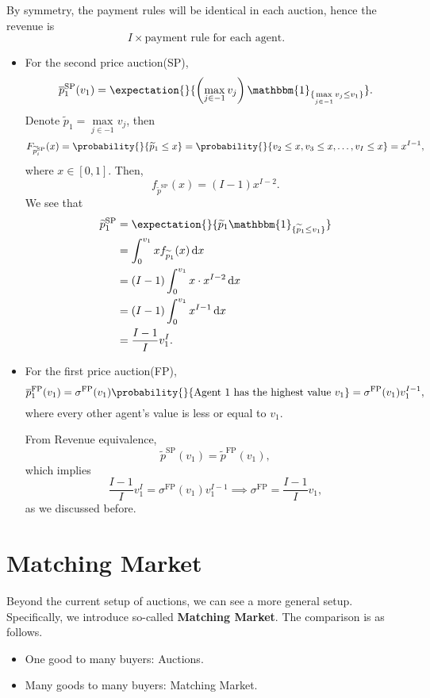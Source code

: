 By symmetry, the payment rules will be identical in each auction, hence the revenue is
\[
	I\times \text{payment rule for each agent}.
\]

\begin{itemize}
	\item For the second price auction(SP),
	      \[
		      \overline{p}_1^{\mathrm{SP}}(v_1) = \expectation{}{\left(\max_{j\in -1}v_{j}\right)\mathbbm{1}_{\{ \max\limits_{j\in -1} v_{j}\leq v_1\}} }.
	      \]
	      Denote \(\widetilde{p}_1 = \max\limits_{j\in -1} v_{j}\), then
	      \[
		      F_{\widetilde{p}^{\mathrm{SP}}_i}(x) = \probability{}{\widetilde{p}_1\leq x} = \probability{}{v_2\leq x, v_3\leq x, \ldots , v_I\leq x} = x^{I-1},
	      \]
	      where \(x\in [0, 1]\). Then,
	      \[
		      f_{\widetilde{p}^{\mathrm{SP}}}(x) = (I - 1)x^{I-2}.
	      \]
	      We see that
	      \[
		      \begin{split}
			      \widetilde{p}_1^{\mathrm{SP}} &= \expectation{}{\widetilde{p}_{1}\mathbbm{1}_{\{ \widetilde{p}_1\leq v_1 \}} }\\
			      &=\int_0^{v_1} xf_{\widetilde{p}_1}(x)\,\mathrm{d}x \\
			      &= (I - 1)\int_0^{v_1}x\cdot x^{I-2}\,\mathrm{d}x \\
			      &= (I - 1)\int_0^{v_1}x^{I-1}\,\mathrm{d}x\\
			      & = \frac{I-1}{I}v_1^I.
		      \end{split}
	      \]
	\item For the first price auction(FP),
	      \[
		      \overline{p}_1^{\mathrm{FP}}(v_1) = \sigma^{\mathrm{FP}}(v_1)\probability{}{\text{Agent 1 has the highest value \(v_1\)}} = \sigma^{\mathrm{FP}}(v_1)v_1^{I-1},
	      \]
	      where every other agent's value is less or equal to \(v_1\).

	      From Revenue equivalence,
	      \[
		      \widetilde{p}^{\mathrm{SP}}(v_1) = \widetilde{p}^{\mathrm{FP}}(v_1),
	      \]
	      which implies
	      \[
		      \frac{I-1}{I}v_{1}^I = \sigma^{\mathrm{FP}}(v_1)v_1^{I-1} \implies \sigma^{\mathrm{FP}} = \frac{I-1}{I}v_1,
	      \]
	      as we discussed before.
\end{itemize}

\chapter{Matching Market}
Beyond the current setup of auctions, we can see a more general setup. Specifically, we introduce so-called \textbf{Matching Market}. The comparison is as follows.
\begin{itemize}
	\item One good to many buyers: Auctions.
	\item Many goods to many buyers: Matching Market.
\end{itemize}


